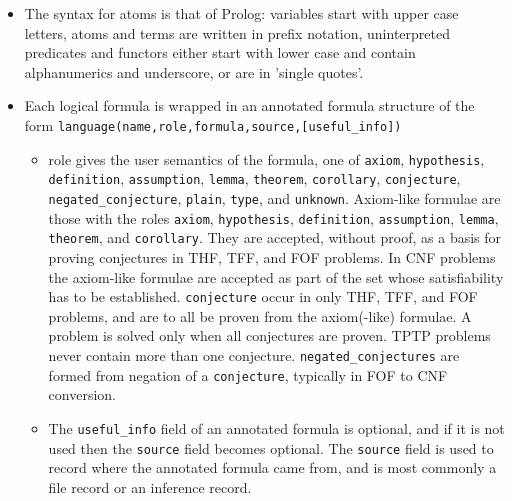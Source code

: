 \documentclass[a4paper,12pt]{article}
\begin{document}
\begin{itemize}
  \item The syntax for atoms is that of Prolog: variables start with upper case letters, atoms and terms are written in prefix notation, uninterpreted predicates and functors either start with lower case and contain alphanumerics and underscore, or are in 'single quotes'.

  \item Each logical formula is wrapped in an annotated formula structure of the form  \newline \texttt{language(name,role,formula,source,[useful_info])}

    \begin{itemize}
      \item role gives the user semantics of the formula, one of
        \texttt{axiom},
        \texttt{hypothesis},
        \texttt{definition},
        \texttt{assumption},
        \texttt{lemma},
        \texttt{theorem},
        \texttt{corollary},
        \texttt{conjecture},
        \texttt{negated_conjecture},
        \texttt{plain},
        \texttt{type},
        and \texttt{unknown}.  Axiom-like formulae are those with the roles
        \texttt{axiom},
        \texttt{hypothesis},
        \texttt{definition},
        \texttt{assumption},
        \texttt{lemma},
        \texttt{theorem},
        and \texttt{corollary}. They are accepted, without proof, as a basis for proving conjectures in THF, TFF, and FOF problems. In CNF problems the axiom-like formulae are accepted as part of the set whose satisfiability has to be established. \texttt{conjecture} occur in only THF, TFF, and FOF problems, and are to all be proven from the axiom(-like) formulae. A problem is solved only when all conjectures are proven. TPTP problems never contain more than one conjecture. \texttt{negated_conjectures} are formed from negation of a \texttt{conjecture}, typically in FOF to CNF conversion.
      \item The \texttt{useful_info} field of an annotated formula is optional, and if it is not used then the \texttt{source} field becomes optional. The \texttt{source} field is used to record where the annotated formula came from, and is most commonly a file record or an inference record.
    \end{itemize}


\end{itemize}
\end{document}
